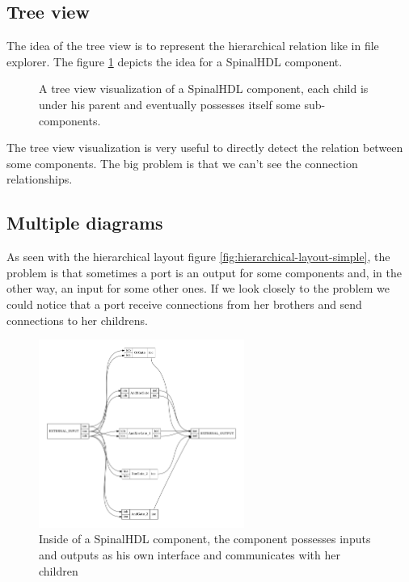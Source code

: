 \subsection{Tree view}

The idea of the tree view is to represent the hierarchical relation like in file
explorer. The figure \ref{fig:tree-view} depicts the idea for a SpinalHDL
component.

\begin{figure}[H]
  \centering
  \caption[SpinalHDL's Component visualization with tree view]{A tree view
    visualization of a SpinalHDL component, each child is under his parent and
    eventually possesses itself some sub-components.}
  \label{fig:tree-view}
\end{figure}

The tree view visualization is very useful to directly detect the relation
between some components. The big problem is that we can't see the connection
relationships.

\subsection{Multiple diagrams}

As seen with the hierarchical layout figure
\ref{fig:hierarchical-layout-simple}, the problem is that sometimes a port is an
output for some components and, in the other way, an input for some other
ones. If we look closely to the problem we could notice that a port receive
connections from her brothers and send connections to her childrens.

\begin{figure}[H]
  \centering
  \includegraphics[width=0.6\textwidth]{img/HierarchicComponent.pdf}
  \caption[SpinalHDL Component inside]{Inside of a SpinalHDL component, the
    component possesses inputs and outputs as his own interface and communicates
  with her children}
  \label{fig:hierarchic-component}
\end{figure}

